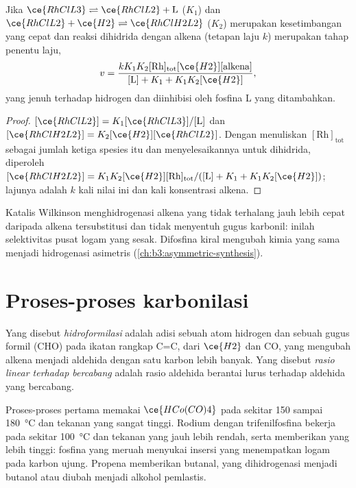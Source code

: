 \begin{proposition}\label{prop:b3:homogeneous-catalysis:wilkinson-rate}
Jika $\ce{RhClL3} \rightleftharpoons \ce{RhClL2} + \mathrm L$ ($K_1$) dan $\ce{RhClL2} + \ce{H2} \rightleftharpoons \ce{RhClH2L2}$ ($K_2$) merupakan kesetimbangan
yang cepat dan reaksi dihidrida dengan alkena (tetapan laju $k$)
merupakan tahap penentu laju,
\[
  v = \frac{kK_1K_2[\mathrm{Rh}]_{\mathrm{tot}}[\ce{H2}][\text{alkena}]}{[\mathrm L] + K_1 + K_1K_2[\ce{H2}]},
\]
yang jenuh terhadap hidrogen dan diinhibisi oleh fosfina L yang ditambahkan.
\end{proposition}

\begin{proof}
$[\ce{RhClL2}] = K_1[\ce{RhClL3}]/[\mathrm L]$ dan $[\ce{RhClH2L2}] = K_2[\ce{H2}][\ce{RhClL2}]$. Dengan menuliskan $[\mathrm{Rh}]_{\mathrm{tot}}$ sebagai
jumlah ketiga spesies itu dan menyelesaikannya untuk dihidrida, diperoleh $[\ce{RhClH2L2}] =
K_1K_2[\ce{H2}][\mathrm{Rh}]_{\mathrm{tot}}/([\mathrm L] + K_1 + K_1K_2[\ce{H2}])$; lajunya adalah $k$ kali nilai ini dan kali konsentrasi
alkena.
\end{proof}

Katalis Wilkinson menghidrogenasi alkena yang tidak terhalang jauh lebih cepat
daripada alkena tersubstitusi dan tidak menyentuh gugus karbonil: inilah selektivitas
pusat logam yang sesak. Difosfina kiral mengubah kimia yang sama menjadi
hidrogenasi asimetris (\cref{ch:b3:asymmetric-synthesis}).

\section{Proses-proses karbonilasi}

\begin{definition}[Hidroformilasi]\label{def:b3:homogeneous-catalysis:hydroformylation}
Yang disebut \emph{hidroformilasi} adalah adisi sebuah atom hidrogen
dan sebuah gugus formil (CHO) pada ikatan rangkap C=C, dari $\ce{H2}$ dan CO, yang mengubah
alkena menjadi aldehida dengan satu karbon lebih banyak. Yang disebut \emph{rasio
linear terhadap bercabang} adalah rasio aldehida
berantai lurus terhadap aldehida yang bercabang.
\end{definition}

Proses-proses pertama memakai $\ce{HCo(CO)4}$ pada sekitar 150 sampai \qty{180}{\celsius} dan tekanan yang sangat
tinggi. Rodium dengan trifenilfosfina bekerja pada sekitar \qty{100}{\celsius} dan
tekanan yang jauh lebih rendah, serta memberikan  yang lebih tinggi: fosfina yang
meruah menyukai insersi yang menempatkan logam pada karbon ujung.
Propena memberikan butanal, yang dihidrogenasi menjadi butanol atau diubah menjadi alkohol
pemlastis.

